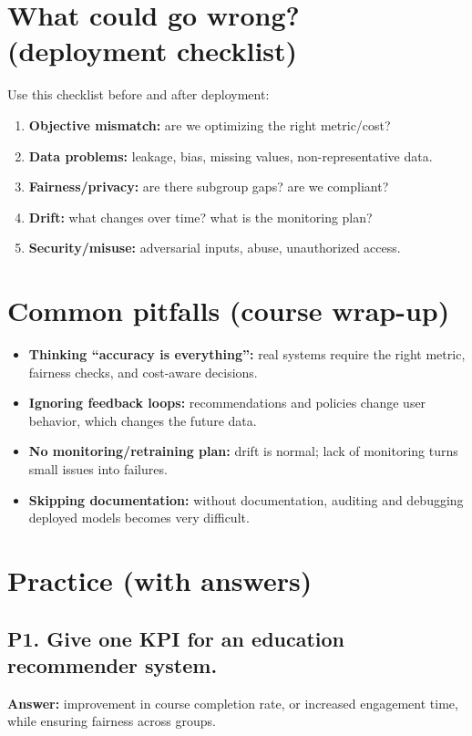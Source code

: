 \documentclass[11pt]{article}
\begin{document}
\section{What could go wrong? (deployment checklist)}
Use this checklist before and after deployment:
\begin{enumerate}[leftmargin=*]
  \item \textbf{Objective mismatch:} are we optimizing the right metric/cost?
  \item \textbf{Data problems:} leakage, bias, missing values, non-representative data.
  \item \textbf{Fairness/privacy:} are there subgroup gaps? are we compliant?
  \item \textbf{Drift:} what changes over time? what is the monitoring plan?
  \item \textbf{Security/misuse:} adversarial inputs, abuse, unauthorized access.
\end{enumerate}

\section{Common pitfalls (course wrap-up)}
\begin{itemize}[leftmargin=*]
  \item \textbf{Thinking ``accuracy is everything'':} real systems require the right metric, fairness checks, and cost-aware decisions.
  \item \textbf{Ignoring feedback loops:} recommendations and policies change user behavior, which changes the future data.
  \item \textbf{No monitoring/retraining plan:} drift is normal; lack of monitoring turns small issues into failures.
  \item \textbf{Skipping documentation:} without documentation, auditing and debugging deployed models becomes very difficult.
\end{itemize}

\section{Practice (with answers)}
\subsection*{P1. Give one KPI for an education recommender system.}
\textbf{Answer:} improvement in course completion rate, or increased engagement time, while ensuring fairness across groups.
\end{document}

